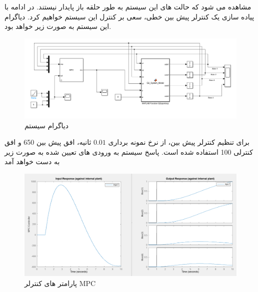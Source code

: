مشاهده می شود که حالت های این سیستم به طور حلقه باز پایدار نیستند.
در ادامه با پیاده سازی یک کنترلر پیش بین خطی، سعی بر کنترل این سیستم خواهیم کرد. دیاگرام این سیستم به صورت زیر خواهد بود.
\begin{figure}[H]
	\centering
	\includegraphics[width=1\linewidth]{../img/Q2_LMPC_diagram}
	\caption{دیاگرام سیستم}
	\label{fig:q2lmpcdiagram}
\end{figure}
برای تنظیم کنترلر پیش بین، از نرخ نمونه برداری $ 0.01 $ ثانیه، افق پیش بین 650 و افق کنترلی 100 استفاده شده است. پاسخ سیستم به ورودی های تعیین شده به صورت زیر به دست خواهد آمد

\begin{figure}[H]
	\centering
	\includegraphics[width=1\linewidth]{../img/Q2_LMPC_ِDesign}
	\caption{پارامتر های کنترلر MPC}
	\label{fig:q2lmpcdesign}
\end{figure}

